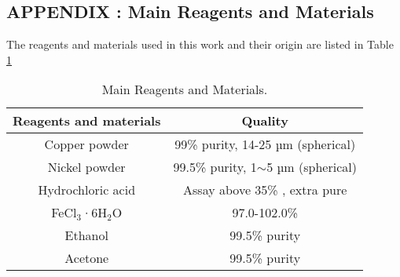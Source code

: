 

\begin{center}
\section*{APPENDIX \thesection : Main Reagents and Materials}	
\end{center}


The reagents and materials used in this work and their origin are listed in Table \ref{tab:Main Reagents and Materials}

\begin{table}[!htb]
\centering
\caption{Main Reagents and Materials.}
{
\begin{tabular}{cc}
\hline
Reagents and materials & Quality                                \\ \hline
Copper powder          & 99\% purity, 14-25 µm (spherical)      \\
Nickel powder          & 99.5\% purity, 1$\sim$5 µm (spherical) \\
Hydrochloric acid      & Assay above 35\% , extra pure          \\
Fe$\text{Cl}_{3}$·6$\text{H}_{2}$O             & 97.0-102.0\%                           \\
Ethanol                & 99.5\% purity                          \\
Acetone                & 99.5\% purity                          \\ \hline
\end{tabular}
}
\label{tab:Main Reagents and Materials}
\end{table}


